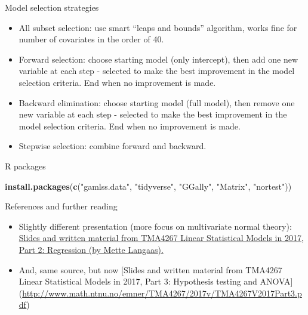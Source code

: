 \documentclass[
  ignorenonframetext,
]{beamer}
\newenvironment{Shaded}{\begin{snugshade}}{\end{snugshade}}
\newcommand{\FunctionTok}[1]{\textcolor[rgb]{0.13,0.29,0.53}{\textbf{#1}}}
\newcommand{\NormalTok}[1]{#1}
\newcommand{\StringTok}[1]{\textcolor[rgb]{0.31,0.60,0.02}{#1}}
\providecommand{\tightlist}{%
  \setlength{\itemsep}{0pt}\setlength{\parskip}{0pt}}
\begin{document}
\begin{frame}
\begin{block}{Model selection strategies}
\label{model-selection-strategies}
\begin{itemize}
\item
  All subset selection: use smart ``leaps and bounds'' algorithm, works
  fine for number of covariates in the order of 40.
\item
  Forward selection: choose starting model (only intercept), then add
  one new variable at each step - selected to make the best improvement
  in the model selection criteria. End when no improvement is made.
\item
  Backward elimination: choose starting model (full model), then remove
  one new variable at each step - selected to make the best improvement
  in the model selection criteria. End when no improvement is made.
\item
  Stepwise selection: combine forward and backward.
\end{itemize}
\end{block}
\end{frame}

\begin{frame}[fragile]{R packages}
\label{r-packages}
\begin{Shaded}
\begin{Highlighting}[]
\FunctionTok{install.packages}\NormalTok{(}\FunctionTok{c}\NormalTok{(}\StringTok{"gamlss.data"}\NormalTok{, }\StringTok{"tidyverse"}\NormalTok{, }\StringTok{"GGally"}\NormalTok{, }\StringTok{"Matrix"}\NormalTok{, }\StringTok{"nortest"}\NormalTok{))}
\end{Highlighting}
\end{Shaded}
\end{frame}

\begin{frame}{References and further reading}
\label{references-and-further-reading}
\begin{itemize}
\tightlist
\item
  Slightly different presentation (more focus on multivariate normal
  theory):
  \href{https://www.math.ntnu.no/emner/TMA4267/2017v/TMA4267V2017Part2.pdf}{Slides
  and written material from TMA4267 Linear Statistical Models in 2017,
  Part 2: Regression (by Mette Langaas).}
\item
  And, same source, but now {[}Slides and written material from TMA4267
  Linear Statistical Models in 2017, Part 3: Hypothesis testing and
  ANOVA{]}
  (\url{http://www.math.ntnu.no/emner/TMA4267/2017v/TMA4267V2017Part3.pdf})
\end{itemize}
\end{frame}
\end{document}
